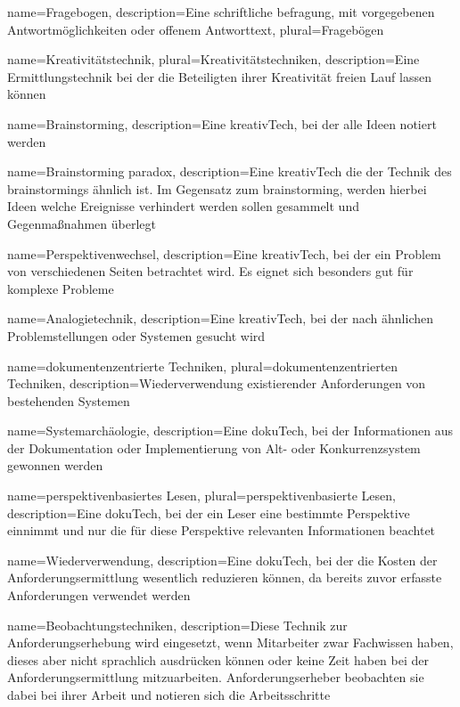  {
	name=Fragebogen,
	description={Eine schriftliche \gls{befragung}, mit vorgegebenen Antwortm\"oglichkeiten oder offenem Antworttext},
	plural=Frageb\"ogen}

 {
	name=Kreativit\"atstechnik,
	plural=Kreativit\"atstechniken,
	description={Eine Ermittlungstechnik bei der die Beteiligten ihrer Kreativit\"at freien Lauf lassen k\"onnen}}
	
 {
	name=Brainstorming,
	description={Eine \gls{kreativTech}, bei der alle Ideen notiert werden}}
	
 {
	name=Brainstorming paradox,
	description={Eine \gls{kreativTech} die der Technik des \gls{brainstorming}s \"ahnlich ist. Im Gegensatz zum \gls{brainstorming}, werden hierbei Ideen welche Ereignisse verhindert werden sollen gesammelt und Gegenma\ss nahmen \"uberlegt}}

 {
	name=Perspektivenwechsel,
	description={Eine \gls{kreativTech}, bei der ein Problem von verschiedenen Seiten betrachtet wird. Es eignet sich besonders gut f\"ur komplexe Probleme}}
		
 {
	name=Analogietechnik,
	description={Eine \gls{kreativTech}, bei der nach \"ahnlichen Problemstellungen oder Systemen gesucht wird}}

 {
	name=dokumentenzentrierte Techniken,
	plural=dokumentenzentrierten Techniken,
	description={Wiederverwendung existierender Anforderungen von bestehenden Systemen}}
	
 {
	name=Systemarch\"aologie,
	description={Eine \gls{dokuTech}, bei der Informationen aus der Dokumentation oder Implementierung von Alt- oder Konkurrenzsystem gewonnen werden}}
	
 {
	name=perspektivenbasiertes Lesen,
	plural=perspektivenbasierte Lesen,
	description={Eine \gls{dokuTech}, bei der ein Leser eine bestimmte Perspektive einnimmt und nur die f\"ur diese Perspektive relevanten Informationen beachtet}}

 {
	name=Wiederverwendung,
	description={Eine \gls{dokuTech}, bei der die Kosten der Anforderungsermittlung wesentlich reduzieren k\"onnen, da bereits zuvor erfasste Anforderungen verwendet werden}}
		
 {
	name=Beobachtungstechniken,
	description={Diese Technik zur Anforderungserhebung wird eingesetzt, 
wenn Mitarbeiter zwar Fachwissen haben, dieses aber nicht sprachlich ausdr\"ucken k\"onnen oder keine Zeit haben bei der Anforderungsermittlung mitzuarbeiten. Anforderungserheber beobachten sie dabei bei ihrer Arbeit und notieren sich die Arbeitsschritte}}

